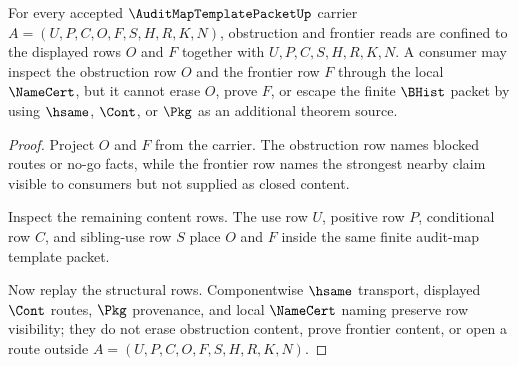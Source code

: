 \begin{theorem}
\label{thm:audit-map-template-packet-obstruction-frontier-nonescape}
For every accepted $\AuditMapTemplatePacketUp$ carrier $A=(U,P,C,O,F,S,H,R,K,N)$, obstruction and frontier reads are confined to the displayed rows $O$ and $F$ together with $U,P,C,S,H,R,K,N$. A consumer may inspect the obstruction row $O$ and the frontier row $F$ through the local $\NameCert$, but it cannot erase $O$, prove $F$, or escape the finite $\BHist$ packet by using $\hsame$, $\Cont$, or $\Pkg$ as an additional theorem source.
\end{theorem}
\begin{proof}
Project $O$ and $F$ from the carrier. The obstruction row names blocked routes or no-go facts, while the frontier row names the strongest nearby claim visible to consumers but not supplied as closed content.

Inspect the remaining content rows. The use row $U$, positive row $P$, conditional row $C$, and sibling-use row $S$ place $O$ and $F$ inside the same finite audit-map template packet.

Now replay the structural rows. Componentwise $\hsame$ transport, displayed $\Cont$ routes, $\Pkg$ provenance, and local $\NameCert$ naming preserve row visibility; they do not erase obstruction content, prove frontier content, or open a route outside $A=(U,P,C,O,F,S,H,R,K,N)$.
\end{proof}

